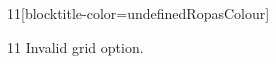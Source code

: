 \documentclass[paper=A4]{ropas-poster}
\begin{document}
\begin{postergrid}{1}{1}[blocktitle-color=undefinedRopasColour]
\begin{posterblock}{1}{1}
Invalid grid option.
\end{posterblock}
\end{postergrid}
\end{document}
